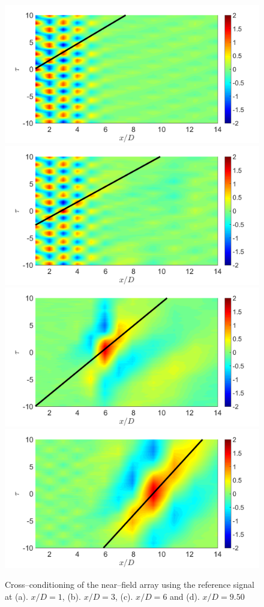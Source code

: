 \begin{figure}
	\centering
		\includegraphics[width=0.45\linewidth]{Figures/conditioning/crossCondSt0p35X1DU0p6502.png} %
		\includegraphics[width=0.45\linewidth]{Figures/conditioning/crossCondSt0p35X3DU0p7053.png}\\
		\includegraphics[width=0.45\linewidth]{Figures/conditioning/crossCondSt0p35X6DU0p4709.png} %
		\includegraphics[width=0.45\linewidth]{Figures/conditioning/crossCondSt0p35X9p5DU0p3532.png}
	\caption{Cross--conditioning of the near--field array using the reference signal at (a). $x/D = 1$, (b). $x/D=3$, (c). $x/D=6$ and (d). $x/D=9.50$}
	\label{fig:crossCondSt0p35}
\end{figure}

